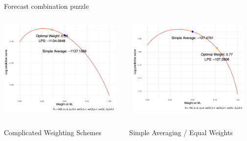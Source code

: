 \begin{frame}{Forecast combination puzzle}

\begin{columns}[t]
    \begin{column}{0.5\textwidth}
        \centering
        \includegraphics[width=6cm]{Graph/Ex1.png}
    \end{column}
    
    \begin{column}{0.5\textwidth}
        \centering
        \includegraphics[width=6cm]{Graph/Ex2.png}
    \end{column}
    \end{columns}


    \begin{columns}[t]
    \begin{column}{0.5\textwidth}
        \begin{alertblock}{}
        \centering
        Complicated Weighting Schemes
        \end{alertblock}
    \end{column}
    
    \begin{column}{0.5\textwidth}
        \begin{exampleblock}{}
        \centering
        Simple Averaging
        / Equal Weights
        \end{exampleblock}
    \end{column}
    \end{columns}

\end{frame}



